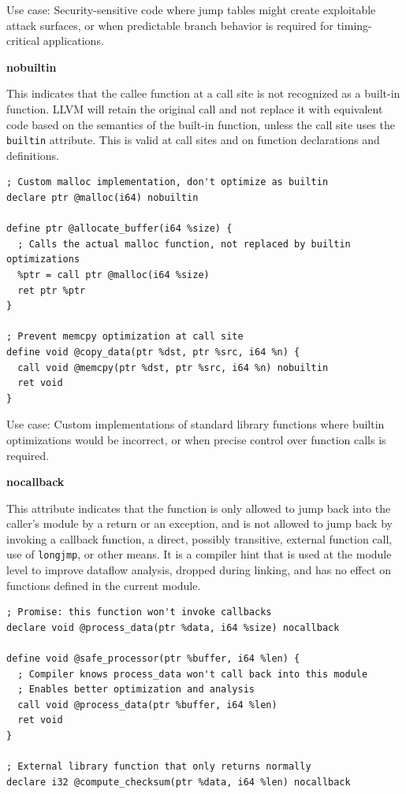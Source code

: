 Use case: Security-sensitive code where jump tables might create exploitable attack surfaces, or when predictable branch behavior is required for timing-critical applications.

\textbf{nobuiltin}

This indicates that the callee function at a call site is not recognized as a built-in function.
LLVM will retain the original call and not replace it with equivalent code based on the semantics of the built-in function, unless the call site uses the \texttt{builtin} attribute.
This is valid at call sites and on function declarations and definitions.

\begin{lstlisting}[style=ir]
; Custom malloc implementation, don't optimize as builtin
declare ptr @malloc(i64) nobuiltin

define ptr @allocate_buffer(i64 %size) {
  ; Calls the actual malloc function, not replaced by builtin optimizations
  %ptr = call ptr @malloc(i64 %size)
  ret ptr %ptr
}

; Prevent memcpy optimization at call site
define void @copy_data(ptr %dst, ptr %src, i64 %n) {
  call void @memcpy(ptr %dst, ptr %src, i64 %n) nobuiltin
  ret void
}
\end{lstlisting}

Use case: Custom implementations of standard library functions where builtin optimizations would be incorrect, or when precise control over function calls is required.

\textbf{nocallback}

This attribute indicates that the function is only allowed to jump back into the caller's module by a return or an exception, and is not allowed to jump back by invoking a callback function, a direct, possibly transitive, external function call, use of \texttt{longjmp}, or other
means.
It is a compiler hint that is used at the module level to improve dataflow analysis, dropped during linking, and has no effect on functions defined in the current module.

\begin{lstlisting}[style=ir]
; Promise: this function won't invoke callbacks
declare void @process_data(ptr %data, i64 %size) nocallback

define void @safe_processor(ptr %buffer, i64 %len) {
  ; Compiler knows process_data won't call back into this module
  ; Enables better optimization and analysis
  call void @process_data(ptr %buffer, i64 %len)
  ret void
}

; External library function that only returns normally
declare i32 @compute_checksum(ptr %data, i64 %len) nocallback
\end{lstlisting}


